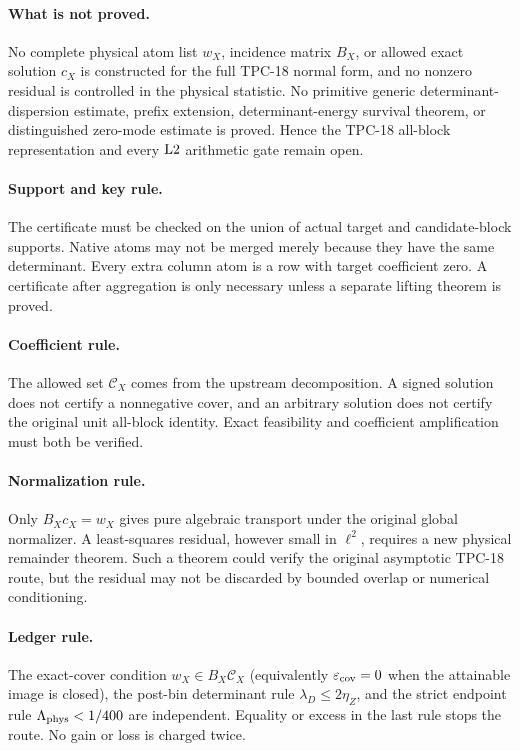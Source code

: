 \paragraph{What is not proved.}
No complete physical atom list \(w_X\), incidence matrix \(B_X\), or
allowed exact solution \(c_X\) is constructed for the full TPC-18
normal form, and no nonzero residual is controlled in the physical
statistic.  No primitive generic determinant-dispersion estimate,
prefix extension, determinant-energy survival theorem, or
distinguished zero-mode estimate is proved.  Hence the TPC-18
all-block representation and every \(\mathrm{L2}\) arithmetic gate remain
open.

\paragraph{Support and key rule.}
The certificate must be checked on the union of actual target and
candidate-block supports.  Native atoms may not be merged merely
because they have the same determinant.  Every extra column atom is a
row with target coefficient zero.  A certificate after aggregation is
only necessary unless a separate lifting theorem is proved.

\paragraph{Coefficient rule.}
The allowed set \(\mathscr C_X\) comes from the upstream
decomposition.  A signed solution does not certify a nonnegative
cover, and an arbitrary solution does not certify the original unit
all-block identity.  Exact feasibility and coefficient amplification
must both be verified.

\paragraph{Normalization rule.}
Only \(B_Xc_X=w_X\) gives pure algebraic transport under the original
global normalizer.  A least-squares residual, however small in
\(\ell^2\), requires a new physical remainder theorem.  Such a theorem
could verify the original asymptotic TPC-18 route, but the residual may
not be discarded by bounded overlap or numerical conditioning.

\paragraph{Ledger rule.}
The exact-cover condition \(w_X\in B_X\mathscr C_X\) (equivalently
\(\varepsilon_{\mathrm{cov}}=0\) when the attainable image is closed), the post-bin determinant rule
\(\lambda_D\le2\eta_Z\), and the strict endpoint rule
\(\Lambda_{\mathrm{phys}}<1/400\) are independent.  Equality or excess in the
last rule stops the route.  No gain or loss is charged twice.

